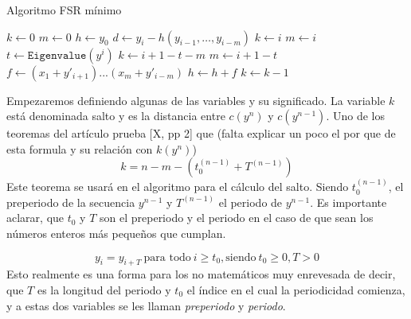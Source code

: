 \begin{algorithm}
\caption{Algoritmo FSR mínimo}\label{alg:three}
$k \gets 0$\;
$m \gets 0$\;
$h \gets y_0$\;
 {
    $d \gets y_i - h(y_{i-1},\dots,y_{i-m})$\;
     {
     {
        $k \gets i$\;
        $m \gets i$\;
    }
     {
        $t \gets \texttt{Eigenvalue$(y^{i})$}$\;
         {
            $k \gets i + 1 - t - m$\;
            $m \gets i + 1 - t$\;
        }
    }
    $f \gets (x_{1} + y'_{i+1})...(x_m+y'_{i-m})$\;
    $h \gets h + f$\;
    }
    $k \gets k - 1$\;
}
\end{algorithm}
\newpage
Empezaremos definiendo algunas de las variables y su significado. La variable $k$ está denominada salto y es la distancia entre $c(y^{n})$ y $c(y^{n-1})$. Uno de los teoremas del artículo prueba [X, pp 2] que (falta explicar un poco el por que de esta formula y su relación con $k(y^n)$)
\[k = n - m - (t^{(n-1)}_0 + T^{(n - 1)})\]
Este teorema se usará en el algoritmo para el cálculo del salto. Siendo $t_0^{(n - 1)}$, el preperiodo de la secuencia $y^{n-1}$ y $T^{(n - 1)}$ el periodo de $y^{n-1}$. Es importante aclarar, que $t_0$ y $T$ son el preperiodo y el periodo en el caso de que sean los números enteros más pequeños que cumplan.

\[y_i = y_{i+T} \ \text{para todo} \ i \geq t_0, \text{siendo} \  t_0 \geq 0, T > 0\]
Esto realmente es una forma para los no matemáticos muy enrevesada de decir, que $T$ es la longitud del periodo y $t_0$ el índice en el cual la periodicidad comienza, y a estas dos variables se les llaman \textit{preperiodo} y \textit{periodo}. \\\\

